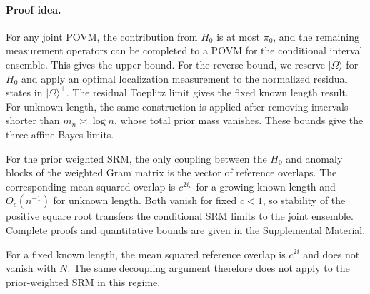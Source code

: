 \paragraph{Proof idea.}
For any joint POVM, the contribution from \(H_0\) is at most \(\pi_0\), and
the remaining measurement operators can be completed to a POVM for the
conditional interval ensemble. This gives the upper bound. For the reverse
bound, we reserve \(\lvert\Omega\rangle\) for \(H_0\) and apply an optimal
localization measurement to the normalized residual states in
\(\lvert\Omega\rangle^\perp\). The residual Toeplitz limit gives the fixed
known length result. For unknown length, the same construction is applied
after removing intervals shorter than \(m_n\asymp\log n\), whose total prior
mass vanishes. These bounds give the three affine Bayes limits.

For the prior weighted SRM, the only coupling between the \(H_0\) and anomaly
blocks of the weighted Gram matrix is the vector of reference overlaps. The
corresponding mean squared overlap is \(c^{2i_n}\) for a growing known length
and \(O_c(n^{-1})\) for unknown length. Both vanish for fixed \(c<1\), so
stability of the positive square root transfers the conditional SRM limits to
the joint ensemble. Complete proofs and quantitative bounds are given in the
Supplemental Material.

For a fixed known length, the mean squared reference overlap is \(c^{2i}\)
and does not vanish with \(N\). The same decoupling argument therefore does
not apply to the prior-weighted SRM in this regime.

